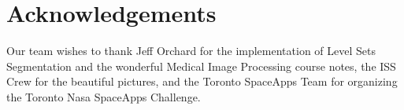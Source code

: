 \documentclass[12pt]{article}
\theoremstyle{definition}
\begin{document}
\section{ \bf Acknowledgements }

Our team wishes to thank Jeff Orchard for the implementation of Level Sets Segmentation and the wonderful Medical Image Processing course notes, the ISS Crew for the beautiful pictures, and the Toronto SpaceApps Team for organizing the Toronto Nasa SpaceApps Challenge.

%




\end{document}
